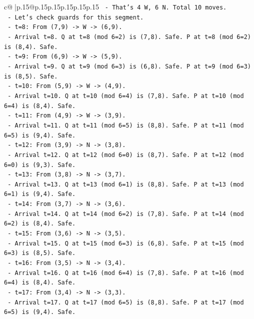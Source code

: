 \documentclass{article}
\begin{document}
{\begin{supertabular}{c@{$\;$}|p{.15\linewidth}@{}p{.15\linewidth}p{.15\linewidth}p{.15\linewidth}p{.15\linewidth}p{.15\linewidth}}
{{{\texttt{     {-} That's 4 W, 6 N. Total 10 moves.} \\
\texttt{     {-} Let's check guards for this segment.} \\
\texttt{     {-} t=8: From (7,9) {-}> W {-}> (6,9).} \\
\texttt{       {-} Arrival t=8. Q at t=8 (mod 6=2) is (7,8). Safe. P at t=8 (mod 6=2) is (8,4). Safe.} \\
\texttt{     {-} t=9: From (6,9) {-}> W {-}> (5,9).} \\
\texttt{       {-} Arrival t=9. Q at t=9 (mod 6=3) is (6,8). Safe. P at t=9 (mod 6=3) is (8,5). Safe.} \\
\texttt{     {-} t=10: From (5,9) {-}> W {-}> (4,9).} \\
\texttt{       {-} Arrival t=10. Q at t=10 (mod 6=4) is (7,8). Safe. P at t=10 (mod 6=4) is (8,4). Safe.} \\
\texttt{     {-} t=11: From (4,9) {-}> W {-}> (3,9).} \\
\texttt{       {-} Arrival t=11. Q at t=11 (mod 6=5) is (8,8). Safe. P at t=11 (mod 6=5) is (9,4). Safe.} \\
\texttt{     {-} t=12: From (3,9) {-}> N {-}> (3,8).} \\
\texttt{       {-} Arrival t=12. Q at t=12 (mod 6=0) is (8,7). Safe. P at t=12 (mod 6=0) is (9,3). Safe.} \\
\texttt{     {-} t=13: From (3,8) {-}> N {-}> (3,7).} \\
\texttt{       {-} Arrival t=13. Q at t=13 (mod 6=1) is (8,8). Safe. P at t=13 (mod 6=1) is (9,4). Safe.} \\
\texttt{     {-} t=14: From (3,7) {-}> N {-}> (3,6).} \\
\texttt{       {-} Arrival t=14. Q at t=14 (mod 6=2) is (7,8). Safe. P at t=14 (mod 6=2) is (8,4). Safe.} \\
\texttt{     {-} t=15: From (3,6) {-}> N {-}> (3,5).} \\
\texttt{       {-} Arrival t=15. Q at t=15 (mod 6=3) is (6,8). Safe. P at t=15 (mod 6=3) is (8,5). Safe.} \\
\texttt{     {-} t=16: From (3,5) {-}> N {-}> (3,4).} \\
\texttt{       {-} Arrival t=16. Q at t=16 (mod 6=4) is (7,8). Safe. P at t=16 (mod 6=4) is (8,4). Safe.} \\
\texttt{     {-} t=17: From (3,4) {-}> N {-}> (3,3).} \\
\texttt{       {-} Arrival t=17. Q at t=17 (mod 6=5) is (8,8). Safe. P at t=17 (mod 6=5) is (9,4). Safe.} \\
}}}
\end{supertabular}}
\end{document}
